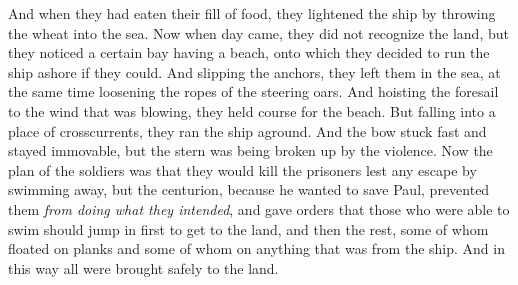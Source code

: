 \begin{biblechapter}
\verse And when they had eaten their fill of food, they lightened the ship by throwing the wheat into the sea.
 Now when day came, they did not recognize the land, but they noticed a certain bay having a beach, onto which they decided to run the ship ashore if they could.
\verse And slipping the anchors, they left them in the sea, at the same time loosening the ropes of the steering oars. And hoisting the foresail to the wind that was blowing, they held course for the beach.
\verse But falling into a place of crosscurrents, they ran the ship aground. And the bow stuck fast and stayed immovable, but the stern was being broken up by the violence.
\verse Now the plan of the soldiers was that they would kill the prisoners lest any escape by swimming away,
\verse but the centurion, because he wanted to save Paul, prevented them \textit{from doing what they intended}, and gave orders that those who were able to swim should jump in first to get to the land,
\verse and then the rest, some of whom floated on planks and some of whom on anything that was from the ship. And in this way all were brought safely to the land.
\end{biblechapter}

